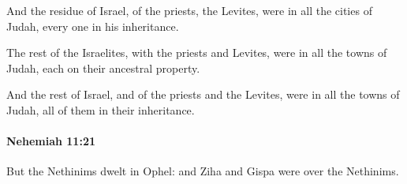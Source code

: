 			\begin{versebox}
					\item[BHS] 
					\item[ASV] And the residue of Israel, of the priests, the Levites, were in all the cities of Judah, every one in his inheritance.
					\item[NIV] The rest of the Israelites, with the priests and Levites, were in all the towns of Judah, each on their ancestral property.
					\item[NRSV] And the rest of Israel, and of the priests and the Levites, were in all the towns of Judah, all of them in their inheritance.
			\end{versebox}

		\paragraph{Nehemiah 11:21} %
			\label{NEHEMIAH-11-21}

			But the Nethinims dwelt in Ophel: and Ziha and Gispa were over the Nethinims.

